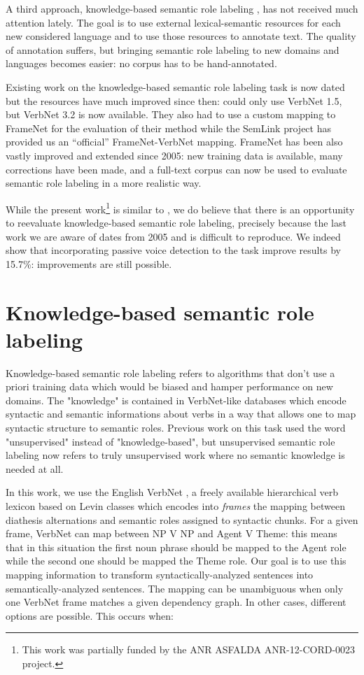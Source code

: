 A third approach, knowledge-based semantic role labeling
\citep{swier2004unsupervised,swier2005exploiting}, has not received much
attention lately. The goal is to use external lexical-semantic resources for
each new considered language and to use those resources to annotate text. The
quality of annotation suffers, but bringing semantic role labeling to new
domains and languages becomes easier: no corpus has to be hand-annotated.

Existing work on the knowledge-based semantic role labeling task is now dated
but the resources have much improved since then:
\citep{swier2005exploiting} could only use VerbNet 1.5, but VerbNet 3.2 is
now available. They also had to use a custom mapping to FrameNet for the evaluation 
of their method while the SemLink project has provided us an ``official'' 
FrameNet-VerbNet mapping. FrameNet has been also vastly
improved and extended since 2005: new training data is available, many
corrections have been made, and a full-text corpus can now be used to evaluate
semantic role labeling in a more realistic way.

While the present work\footnote{This work was partially funded by the ANR
ASFALDA ANR-12-CORD-0023 project.} is similar to
\citep{swier2005exploiting}, we do believe that there is an opportunity to
reevaluate knowledge-based semantic role labeling, precisely because the last
work we are aware of dates from 2005 and is difficult to reproduce. We indeed
show that incorporating passive voice detection to the task improve results by
15.7\%: improvements are still possible.

\section{Knowledge-based semantic role labeling}
\label{sec:srl}

Knowledge-based semantic role labeling refers to algorithms that don't use a
priori training data which would be biased and hamper performance on new
domains. The "knowledge" is contained in VerbNet-like databases which encode
syntactic and semantic informations about verbs in a way that allows one to map
syntactic structure to semantic roles. Previous work on this task used the word
"unsupervised" instead of "knowledge-based", but unsupervised semantic role
labeling now refers to truly unsupervised work where no semantic knowledge is
needed at all.

In this work, we use the English VerbNet \citep{kipper2006extending}, a
freely available hierarchical verb lexicon based on Levin classes
\citep{levin1993english} which encodes into \emph{frames} the mapping
between diathesis alternations and semantic roles assigned to syntactic chunks.
For a given frame, VerbNet can map between NP V NP and Agent V Theme: this
means that in this situation the first noun phrase should be mapped to the
Agent role while the second one should be mapped the Theme role. Our goal is to
use this mapping information to transform syntactically-analyzed sentences into
semantically-analyzed sentences. The mapping can be unambiguous when only one
VerbNet frame matches a given dependency graph. In other cases, different options are
possible. This occurs when: 

